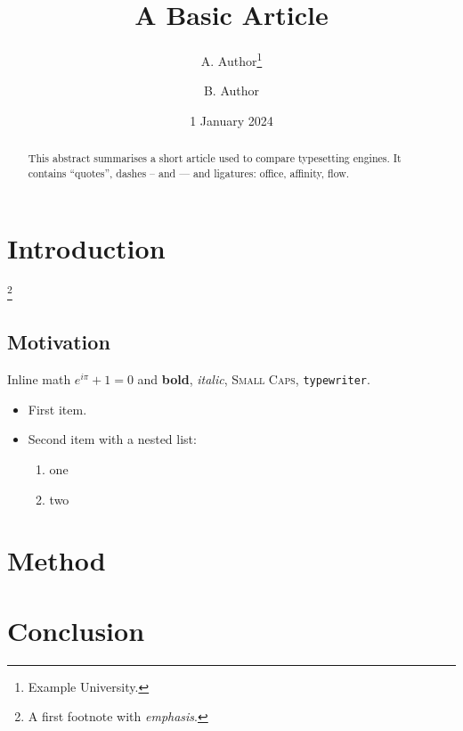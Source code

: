 \documentclass[11pt]{article}
\title{A Basic Article}
\author{A. Author\thanks{Example University.} \and B. Author}
\date{1 January 2024}
\begin{document}
\maketitle
\begin{abstract}
This abstract summarises a short article used to compare typesetting engines. It contains ``quotes'', dashes -- and --- and ligatures: office, affinity, flow.
\end{abstract}
\tableofcontents
\section{Introduction}
\lipsum[1-2]\footnote{A first footnote with \emph{emphasis}.}
\subsection{Motivation}
\lipsum[3] Inline math $e^{i\pi}+1=0$ and \textbf{bold}, \textit{italic}, \textsc{Small Caps}, \texttt{typewriter}.
\begin{itemize}
\item First item.
\item Second item with a nested list:
  \begin{enumerate}
  \item one
  \item two
  \end{enumerate}
\end{itemize}
\section{Method}
\lipsum[4-5]
\begin{quote}
\lipsum[6][1-3]
\end{quote}
\section{Conclusion}
\lipsum[7]
\end{document}
